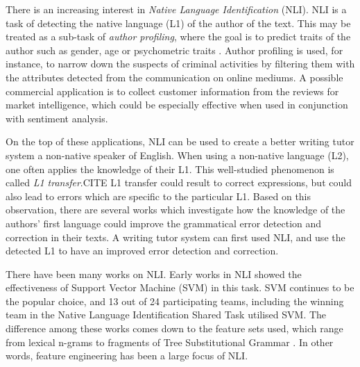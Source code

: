 There is an increasing interest in \emph{Native Language Identification} (NLI).
NLI is a task of detecting the native language (L1) of the author of the text.
This may be treated as a sub-task of \emph{author profiling}, where the goal is to predict traits of the author such as gender, age or psychometric traits \citep{estival2007author}.
Author profiling is used, for instance, to narrow down the suspects of criminal activities\citep{abbasi2005applying} by filtering them with the attributes detected from the communication on online mediums.
A possible commercial application is to collect customer information from the reviews for market intelligence\citep{glance2005deriving}, which could be especially effective when used in conjunction with sentiment analysis.

On the top of these applications, NLI can be used to create a better writing tutor system a non-native speaker of English.
When using a non-native language (L2), one often applies the knowledge of their L1.
This well-studied phenomenon is called \emph{L1 transfer}.\color{red}CITE\color{black}
L1 transfer could result to correct expressions, but could also lead to errors which are specific to the particular L1. 
Based on this observation, there are several works \citep{chang2008automatic, rozovskaya2010generating, rozovskaya2011algorithm, dahlmeier2011correcting} which investigate how the knowledge of the authors' first language could improve the grammatical error detection and correction in their texts.
A writing tutor system can first used NLI, and use the detected L1 to have an improved error detection and correction.

There have been many works on NLI.
Early works in NLI\citep{koppel2005determining, tsur2007using} showed the effectiveness of Support Vector Machine (SVM) in this task.
SVM continues to be the popular choice, and 13 out of 24 participating teams, including the winning team \citep{jarvis2013maximizing} in the Native Language Identification Shared Task \citep{tetreault2013report} utilised SVM.
The difference among these works comes down to the feature sets used, which range from lexical n-grams \citep{koppel2005determining, tsur2007using, jarvis2013maximizing} to fragments of Tree Substitutional Grammar \citep{swanson2012native}.
In other words, feature engineering has been a large focus of NLI.

